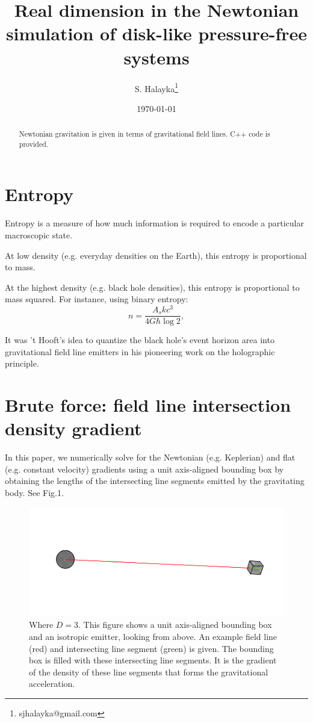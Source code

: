 \documentclass[12pt]{article}
\title{Real dimension in the Newtonian simulation of disk-like pressure-free systems}
\author{S. Halayka\footnote{sjhalayka@gmail.com}}
\date{\today\;\currenttime}
\begin{document}
 
\maketitle

\begin{abstract}
Newtonian gravitation is given in terms of gravitational field lines.
C++ code is provided.
\end{abstract}




\section{Entropy}
Entropy is a measure of how much information is required to encode a particular macroscopic state.

At low density (e.g. everyday densities on the Earth), this entropy is proportional to mass.

At the highest density (e.g. black hole densities), this entropy is proportional to mass squared.
For instance, using binary entropy:
\begin{equation}
n = \frac{A_s k c^3}{ 4 G \hbar \log 2},
\end{equation}

It was 't Hooft's idea to quantize the black hole's event horizon area into gravitational field line emitters in his pioneering work on the holographic principle.




\section{Brute force: field line intersection density gradient}

In this paper, we numerically solve for the Newtonian (e.g. Keplerian) and flat (e.g. constant velocity) gradients using a unit axis-aligned bounding box by obtaining the lengths of the intersecting line segments emitted by the gravitating body. See Fig.1. 



\begin{figure} 
\centering
\label{fig1}
  \includegraphics[width = 6 in]{AABB.png}
  \caption{
Where $D = 3$.
This figure shows a unit axis-aligned bounding box and an isotropic emitter, looking from above.
An example field line (red) and intersecting line segment (green) is given.
The bounding box is filled with these intersecting line segments.
It is the gradient of the density of these line segments that forms the gravitational acceleration.
}
\end{figure}
\end{document}
